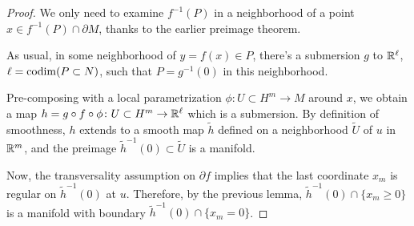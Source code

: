 \begin{proof}
    We only need to examine $f^{-1}(P)$ in a neighborhood of a point $x \in f^{-1}(P) \cap \partial M$, thanks to the earlier preimage theorem.

    As usual, in some neighborhood of $y = f(x) \in P$, there's a submersion $g$ to $\mathbb{R}^\ell$, $\ell = \operatorname{codim}(P \subset N)$, such that $P = g^{-1}(0)$ in this neighborhood.

    \begin{center}
    \end{center}

    Pre-composing with a local parametrization $\phi \colon U \subset H^m \to M$ around $x$, we obtain a map $h = g \circ f \circ \phi \colon U \subset H^m \to \mathbb{R}^\ell$ which is a submersion. By definition of smoothness, $h$ extends to a smooth map $\tilde{h}$ defined on a neighborhood $\tilde{U}$ of $u$ in $\mathbb{R}^m$, and the preimage $\tilde{h}^{-1}(0) \subset \tilde{U}$ is a manifold.

    Now, the transversality assumption on $\partial f$ implies that the last coordinate $x_m$ is regular on $\tilde{h}^{-1}(0)$ at $u$. Therefore, by the previous lemma, $\tilde{h}^{-1}(0) \cap \{x_m \geq 0\}$ is a manifold with boundary $\tilde{h}^{-1}(0) \cap \{x_m = 0\}$.
\end{proof}
